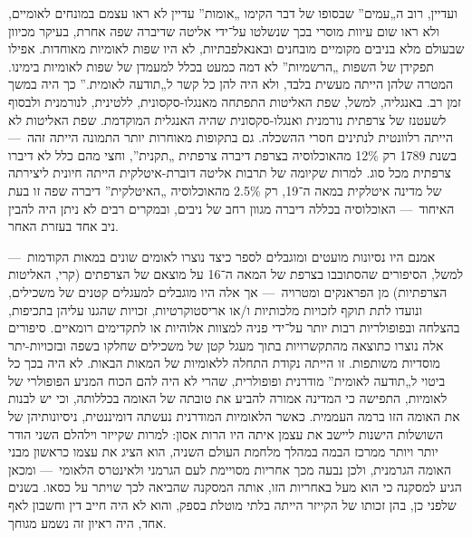 ועדיין, רוב ה„עמים” שבסופו של דבר הקימו „אומות” עדיין לא ראו עצמם במונחים לאומיים, ולא ראו שום עיוות מוסרי בכך שנשלטו על־ידי אליטה שדיברה שפה אחרת, בעיקר מכיוון שבעולם מלא בניבים מקומיים מובחנים ובאנאלפבתיות, לא היו שפות לאומיות מאוחדות. אפילו תפקידן של השפות „הרשמיות” לא דמה כמעט בכלל למעמדן של שפות לאומיות בימינו. המטרה שלהן הייתה מעשית בלבד, ולא היה להן כל קשר ל„תודעה לאומית.” כך היה במשך זמן רב. באנגליה, למשל, שפת האליטות התפתחה מאנגלו-סקסונית, ללטינית, לנורמנית ולבסוף לשעטנז של צרפתית נורמנית ואנגלו-סקסונית שהיה האנגלית המוקדמת. שפת האליטות לא הייתה רלוונטית לנתינים חסרי ההשכלה. גם בתקופות מאוחרות יותר התמונה הייתה זהה~— בשנת 1789 רק 12\% מהאוכלוסיה בצרפת דיברה צרפתית „תקנית”, וחצי מהם כלל לא דיברו צרפתית מכל סוג. למרות שקיומה של תרבות אליטה דוברת-איטלקית הייתה חיונית ליצירתה של מדינה איטלקית במאה ה־19, רק 2.5\% מהאוכלוסיה „האיטלקית” דיברה שפה זו בעת האיחוד~— האוכלוסיה בכללה דיברה מגוון רחב של ניבים, ובמקרים רבים לא ניתן היה להבין ניב אחד בעזרת האחר.

אמנם היו נסיונות מועטים ומוגבלים לספר כיצד נוצרו לאומים שונים במאות הקודמות~— למשל, הסיפורים שהסתובבו בצרפת של המאה ה־16 על מוצאם של הצרפתים (קרי, האליטות הצרפתיות) מן הפראנקים ומטרויה~— אך אלה היו מוגבלים למעגלים קטנים של משכילים, ונועדו לתת תוקף לזכויות מלכותיות ו/או אריסטוקרטיות, זכויות שהגנו עליהן בתכיפות, בהצלחה ובפופולריות רבות יותר על־ידי פניה למצוות אלוהיות או לתקדימים רומאיים. סיפורים אלה נוצרו כתוצאה מהתקשרויות בתוך מעגל קטן של משכילים שחלקו בשפה ובזכויות-יתר מוסדיות משותפות. זו הייתה נקודת התחלה ללאומיות של המאות הבאות. לא היה בכך כל ביטוי ל„תודעה לאומית” מודרנית ופופולרית, שהרי לא היה להם הכוח המניע הפופולרי של לאומיות, התפישה כי המדינה אמורה להביע את טובתה של האומה בכללותה, וכי יש לבנות את האומה הזו ברמה העממית. כאשר הלאומיות המודרנית נעשתה דומיננטית, ניסיונותיהן של השושלות הישנות ליישב את עצמן איתה היו הרות אסון: למרות שקייזר וילהלם השני הודר יותר ויותר ממרכז הבמה במהלך מלחמת העולם השניה, הוא הציג את עצמו כראשון מבני האומה הגרמנית, ולכן נבעה מכך אחריות מסויימת לעם הגרמני ולאינטרס הלאומי~— ומכאן הגיע למסקנה כי הוא מעל באחריות הזו, אותה המסקנה שהביאה לכך שויתר על כסאו. בשנים שלפני כן, בהן זכותו של הקייזר הייתה בלתי מוטלת בספק, והוא לא היה חייב דין וחשבון לאף אחד, היה ראיון זה נשמע מגוחך.

